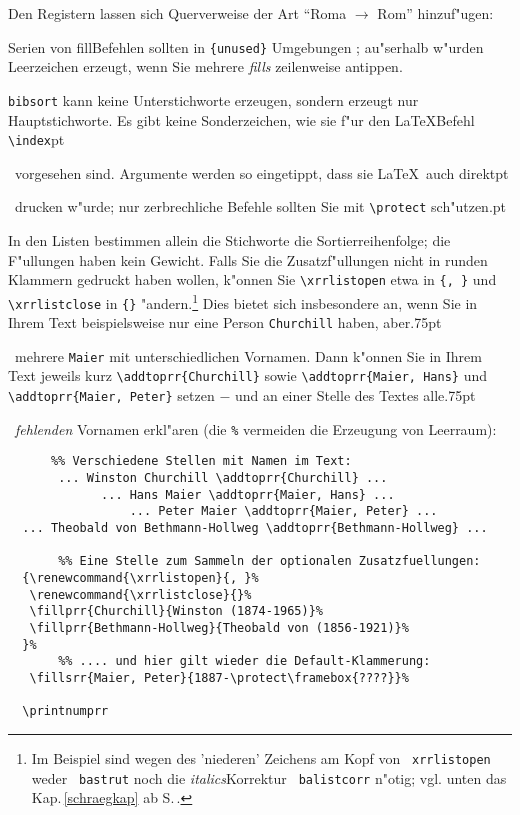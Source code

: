 \documentclass[12pt,a4paper]{article}
\newcommand{\pdfko}[1]{\kern #1pt
                          \strut\ignorespaces}%
\newcommand{\pbs}{\string\ \unskip}
\newcommand{\bs}{\protect\pbs}
\begin{document}
\vspace{-1ex}\noindent
Den Registern lassen sich Querverweise der Art "`Roma $\rightarrow$ Rom"' 
hinzuf"ugen:

\label{xrrlistclose}%

\vspace{-.25ex}\noindent
Serien von fill\hy Befehlen sollten in \verb|{unused}|\hy 
Umgebungen ; au"serhalb w"urden Leerzeichen 
erzeugt, wenn Sie mehrere \textit{fills} zeilenweise antippen.

\vspace{1.5ex}\noindent
\verb|bibsort| kann keine Unterstichworte erzeugen, sondern erzeugt nur 
Hauptstichworte. Es gibt keine Sonderzeichen, wie sie
f"ur den \LaTeX\hy Befehl \verb|\index|\pdfko{1.75}\  
vorgesehen sind. 
Argumente werden so eingetippt, dass sie \LaTeX\ auch direkt\pdfko{1}\ 
drucken w"urde; nur zerbrechliche Befehle sollten
Sie mit \verb|\protect| sch"utzen.\pdfko{1}

In den Listen bestimmen allein die Stichworte die Sortierreihenfolge;
die F"ullungen haben kein Gewicht. Falls Sie die Zusatzf"ullungen nicht in
runden Klammern gedruckt haben wollen, k"onnen Sie \verb|\xrrlistopen| 
etwa in \verb|{, }| und \verb|\xrrlistclose| in \verb|{}| 
"andern.\footnote{Im Beispiel sind wegen des 'niederen' Zeichens 
am Kopf von \texttt{\bs xrrlistopen} weder \texttt{\bs bastrut} noch die 
\textit{italics}\hy Korrektur \texttt{\bs balistcorr} n"otig; vgl. 
unten das Kap.\,\ref{schraegkap} ab S.\,\pageref{schraegkap}.} Dies 
bietet sich insbesondere an, wenn Sie in Ihrem Text beispielsweise nur
eine Person \verb|Churchill| haben, aber\pdfko{.75}\ 
mehrere \verb|Maier| mit unterschiedlichen
Vornamen. Dann k"onnen Sie in Ihrem Text jeweils kurz \verb|\addtoprr{Churchill}| 
sowie \verb|\addtoprr{Maier, Hans}| und \verb|\addtoprr{Maier, Peter}| setzen 
$-$ und an einer Stelle des Textes alle\pdfko{.75}\  
\textit{fehlenden} Vornamen erkl"aren (die \texttt{\%}
vermeiden die Erzeugung von Leerraum):

{\small\begin{verbatim}
      %% Verschiedene Stellen mit Namen im Text:
       ... Winston Churchill \addtoprr{Churchill} ...
             ... Hans Maier \addtoprr{Maier, Hans} ...
                 ... Peter Maier \addtoprr{Maier, Peter} ...
  ... Theobald von Bethmann-Hollweg \addtoprr{Bethmann-Hollweg} ...
 
       %% Eine Stelle zum Sammeln der optionalen Zusatzfuellungen:
  {\renewcommand{\xrrlistopen}{, }%
   \renewcommand{\xrrlistclose}{}%
   \fillprr{Churchill}{Winston (1874-1965)}%
   \fillprr{Bethmann-Hollweg}{Theobald von (1856-1921)}%
  }%
       %% .... und hier gilt wieder die Default-Klammerung:
   \fillsrr{Maier, Peter}{1887-\protect\framebox{????}}%

  \printnumprr
\end{verbatim}}
\end{document}
